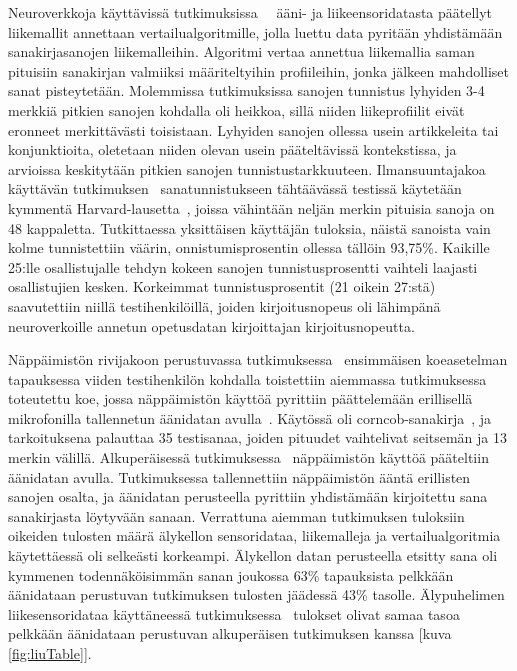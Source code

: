 \documentclass[finnish]{tktltiki2}
\theoremstyle{definition}
\theoremstyle{remark}
\begin{document}
Neuroverkkoja käyttävissä tutkimuksissa~\cite{maiti}~\cite{liu} ääni- ja liikeensoridatasta päätellyt liikemallit annettaan vertailualgoritmille, jolla luettu data pyritään yhdistämään sanakirjasanojen liikemalleihin. Algoritmi vertaa annettua liikemallia saman pituisiin sanakirjan valmiiksi määriteltyihin profiileihin, jonka jälkeen mahdolliset sanat pisteytetään. Molemmissa tutkimuksissa sanojen tunnistus lyhyiden 3-4 merkkiä pitkien sanojen kohdalla oli heikkoa, sillä niiden liikeprofiilit eivät eronneet merkittävästi toisistaan. Lyhyiden sanojen ollessa usein artikkeleita tai konjunktioita, oletetaan niiden olevan usein pääteltävissä kontekstissa, ja arvioissa keskitytään pitkien sanojen tunnistustarkkuuteen. Ilmansuuntajakoa käyttävän tutkimuksen~\cite{maiti} sanatunnistukseen tähtäävässä testissä käytetään kymmentä  Harvard-lausetta~\cite{har}, joissa vähintään neljän merkin pituisia sanoja on 48 kappaletta. Tutkittaessa yksittäisen käyttäjän tuloksia, näistä sanoista vain kolme tunnistettiin väärin, onnistumisprosentin ollessa tällöin 93,75\%. Kaikille 25:lle osallistujalle tehdyn kokeen sanojen tunnistusprosentti vaihteli laajasti osallistujien kesken. Korkeimmat tunnistusprosentit (21 oikein 27:stä) saavutettiin niillä testihenkilöillä, joiden kirjoitusnopeus oli lähimpänä neuroverkoille annetun opetusdatan kirjoittajan kirjoitusnopeutta. 

Näppäimistön rivijakoon perustuvassa tutkimuksessa~\cite{liu} ensimmäisen koeasetelman tapauksessa viiden testihenkilön kohdalla toistettiin aiemmassa tutkimuksessa toteutettu koe, jossa näppäimistön käyttöä pyrittiin päättelemään erillisellä mikrofonilla tallennetun äänidatan avulla~\cite{berger}. Käytössä oli corncob-sanakirja~\cite{corn}, ja tarkoituksena palauttaa 35 testisanaa, joiden pituudet vaihtelivat seitsemän ja 13 merkin välillä.
Alkuperäisessä tutkimuksessa~\cite{berger} näppäimistön käyttöä pääteltiin äänidatan avulla. Tutkimuksessa tallennettiin näppäimistön ääntä erillisten sanojen osalta, ja äänidatan perusteella pyrittiin yhdistämään kirjoitettu sana sanakirjasta löytyvään sanaan. Verrattuna aiemman tutkimuksen tuloksiin oikeiden tulosten määrä älykellon sensoridataa, liikemalleja ja vertailualgoritmia käytettäessä oli selkeästi korkeampi. Älykellon datan perusteella etsitty sana oli kymmenen todennäköisimmän sanan joukossa 63\% tapauksista pelkkään äänidataan perustuvan tutkimuksen tulosten jäädessä 43\% tasolle. Älypuhelimen liikesensoridataa käyttäneessä tutkimuksessa~\cite{mar} tulokset olivat samaa tasoa pelkkään äänidataan perustuvan alkuperäisen tutkimuksen kanssa [kuva \ref{fig:liuTable}].
\end{document}
